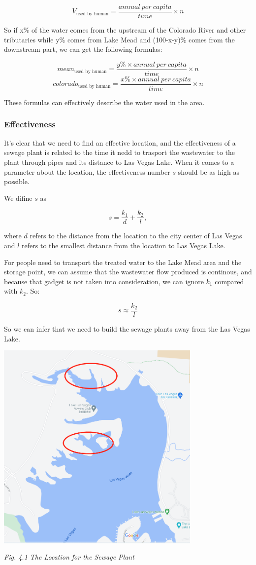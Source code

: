 \documentclass[12pt]{article}
\theoremstyle{definition}
\theoremstyle{remark}
\numberwithin{equation}{section}
\begin{document}
			$$V_{\text{used by human}}=\frac{annual\ per\ capita}{time}\times{n}$$

			So if x\% of the water comes from the upstream of the Colorado River and other tributaries while y\% comes from Lake Mead and (100-x-y)\% comes from the downstream part, we can get the following formulas:

			$$mean_{\text{used by human}}=\frac{{y\%}\times{annual\ per\ capita}}{time}\times{n}$$
			$$colorado_{\text{used by human}}=\frac{{x\%}\times{annual\ per\ capita}}{time}\times{n}$$

			These formulas can effectively describe the water used in the area.

		\subsubsection{Effectiveness}
			It's clear that we need to find an effective location, and the effectiveness of a sewage plant is related to the time it nedd to trasport the wastewater to the plant through pipes and its distance to Las Vegas Lake. When it comes to a parameter about the location, the effectiveness number $s$ should be as high as possible.

			We difine $s$ as

			$$s=\frac{k_1}{d}+\frac{k_2}{l},$$

			where $d$ refers to the distance from the location to the city center of Las Vegas and $l$ refers to the smallest distance from the location to Las Vegas Lake.

			For people need to transport the treated water to the Lake Mead area and the storage point, we can assume that the wastewater flow produced is continous, and because that gadget is not taken into consideration, we can ignore $k_1$ compared with $k_2$. So:

			$$s\approx\frac{k_2}{l}$$

			So we can infer that we need to build the sewage plants away from the Las Vegas Lake.

			\begin{center}
				\includegraphics[width=10cm]{4.1 The Location for the Sewage Plant.png}
				
				\textit{Fig. 4.1 The Location for the Sewage Plant}
			\end{center}
\end{document}
